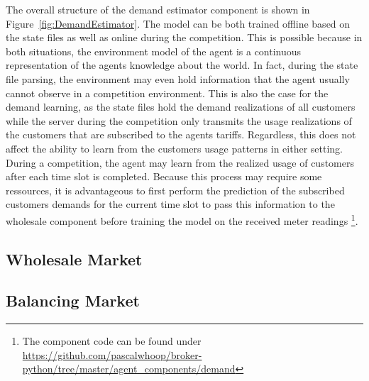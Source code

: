 The overall structure of the demand estimator component is shown in Figure~\ref{fig:DemandEstimator}. The model can be both trained offline based on the state files as well as online during the competition. This is possible because in both situations, the environment model of the agent is a continuous representation of the agents knowledge about the world. In fact, during the state file parsing, the environment may even hold information that the agent usually cannot observe in a competition environment. This is also the case for the demand learning, as the state files hold the demand realizations of all customers while the server during the competition only transmits the usage realizations of the customers that are subscribed to the agents tariffs. Regardless, this does not affect the ability to learn from the customers usage patterns in either setting. During a competition, the agent may learn from the realized usage of customers after each time slot is completed. Because this process may require some ressources, it is advantageous to first perform the prediction of the subscribed customers demands for the current time slot to pass this information to the wholesale component before training the model on the received meter readings
\footnote{The component code can be found under \url{https://github.com/pascalwhoop/broker-python/tree/master/agent_components/demand}}.


\subsection{Wholesale Market}
\subsection{Balancing Market}
